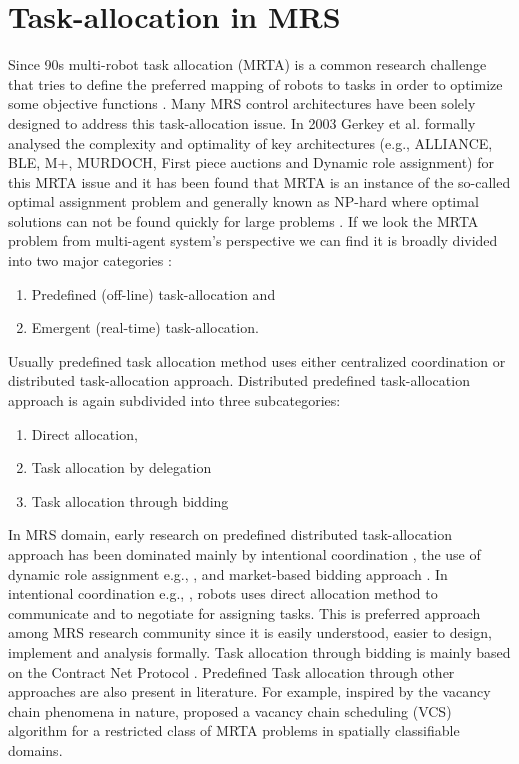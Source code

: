 \section{Task-allocation in MRS}
\label{bg:mrta}
Since 90s multi-robot task allocation (MRTA) is a common research challenge that tries to define the preferred mapping of robots to tasks in order to optimize some objective functions  \cite{Gerkey+2004}. Many MRS control architectures have been solely designed to address this task-allocation issue. In 2003 Gerkey et al. formally analysed the complexity and optimality of key architectures (e.g., ALLIANCE, BLE, M+, MURDOCH, First piece auctions and Dynamic role assignment) for this MRTA issue and it has been found that MRTA is an instance of the so-called optimal assignment problem \cite{Gerkey+2003} and generally known as NP-hard where optimal solutions can not be found quickly for large problems \cite{Gerkey+2004}. 
If we look the MRTA problem from multi-agent system's perspective we can find it is broadly divided into two major categories \cite{Shen+2001}: 
\begin{enumerate}
\item Predefined (off-line) task-allocation and 
\item Emergent (real-time) task-allocation. 
\end{enumerate}
Usually predefined task allocation method uses either centralized coordination or distributed task-allocation approach. Distributed predefined task-allocation approach is again subdivided into three subcategories: 
\begin{enumerate}
\item Direct allocation, 
\item Task allocation by delegation 
\item Task allocation through bidding
\end{enumerate}
In MRS domain, early research on predefined distributed task-allocation approach has been dominated mainly by intentional coordination \cite{Gerkey+2004,Parker1998}, the use of dynamic role assignment e.g., \cite{Chaimowicz2002}, and market-based bidding approach \cite{Dias+2006}. In intentional coordination e.g., \cite{Parker1998}, robots uses direct allocation method to communicate and to negotiate for assigning tasks. This is preferred approach among MRS research community since it is easily understood, easier to design, implement and analysis formally. Task allocation through bidding is mainly based on the Contract Net Protocol \cite{Davis1988+}. Predefined Task allocation through other approaches are also present in literature. For example, inspired by the vacancy chain phenomena in nature, \cite{Dahl+2003} proposed a vacancy chain scheduling (VCS) algorithm for a restricted class of MRTA problems in spatially classifiable domains.

